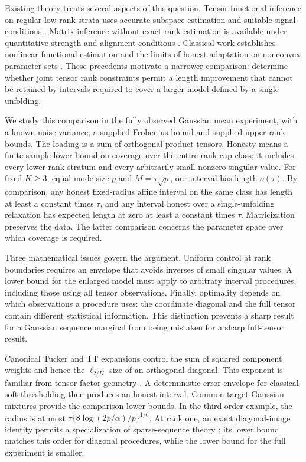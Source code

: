 \documentclass[11pt]{article}
\theoremstyle{remark}
\begin{document}
Existing theory treats several aspects of this question. Tensor functional inference on regular low-rank strata uses accurate subspace estimation and suitable signal conditions \citep{xu2025}. Matrix inference without exact-rank estimation is available under quantitative strength and alignment conditions \citep{choi2026}. Classical work establishes nonlinear functional estimation and the limits of honest adaptation on nonconvex parameter sets \citep{cailownonconvex2004,cailow2004,collier2017}. These precedents motivate a narrower comparison: determine whether joint tensor rank constraints permit a length improvement that cannot be retained by intervals required to cover a larger model defined by a single unfolding.

We study this comparison in the fully observed Gaussian mean experiment, with a known noise variance, a supplied Frobenius bound and supplied upper rank bounds. The loading is a sum of orthogonal product tensors. Honesty means a finite-sample lower bound on coverage over the entire rank-cap class; it includes every lower-rank stratum and every arbitrarily small nonzero singular value. For fixed $K\ge3$, equal mode size $p$ and $M=\tau\sqrt p$, our interval has length $o(\tau)$. By comparison, any honest fixed-radius affine interval on the same class has length at least a constant times $\tau$, and any interval honest over a single-unfolding relaxation has expected length at zero at least a constant times $\tau$. Matricization preserves the data. The latter comparison concerns the parameter space over which coverage is required.

Three mathematical issues govern the argument. Uniform control at rank boundaries requires an envelope that avoids inverses of small singular values. A lower bound for the enlarged model must apply to arbitrary interval procedures, including those using all tensor observations. Finally, optimality depends on which observations a procedure uses: the coordinate diagonal and the full tensor contain different statistical information. This distinction prevents a sharp result for a Gaussian sequence marginal from being mistaken for a sharp full-tensor result.

Canonical Tucker and TT expansions control the sum of squared component weights and hence the $\ell_{2/K}$ size of an orthogonal diagonal. This exponent is familiar from tensor factor geometry \citep{fan2023}. A deterministic error envelope for classical soft thresholding \citep{donohojohnstone1994} then produces an honest interval. Common-target Gaussian mixtures provide the comparison lower bounds. In the third-order example, the radius is at most $\tau\{8\log(2p/\alpha)/p\}^{1/6}$. At rank one, an exact diagonal-image identity permits a specialization of sparse-sequence theory \citep{collier2017}; its lower bound matches this order for diagonal procedures, while the lower bound for the full experiment is smaller.
\end{document}
